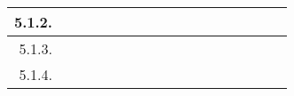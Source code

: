 \documentclass[12pt]{article}
\begin{document}
\begin{table}[H]
{\begin{tabular}{|rllllllllllllllll|}
			\multicolumn{1}{|r|}{5.1.2.}                                       & \multicolumn{1}{c|}{\cellcolor[HTML]{B6D7A8}}  & \multicolumn{1}{c|}{\cellcolor[HTML]{B6D7A8}}  & \multicolumn{1}{l|}{}                          & \multicolumn{1}{l|}{}                          & \multicolumn{1}{l|}{}                          & \multicolumn{1}{l|}{}                          & \multicolumn{1}{l|}{}                          & \multicolumn{1}{l|}{}                          & \multicolumn{1}{l|}{}                          & \multicolumn{1}{l|}{}                           & \multicolumn{1}{l|}{}                           & \multicolumn{1}{l|}{}                           & \multicolumn{1}{l|}{}                           & \multicolumn{1}{l|}{}                           & \multicolumn{1}{l|}{}                           &                                                 \\ \hline
			\multicolumn{1}{|r|}{5.1.3.}                                       & \multicolumn{1}{l|}{}                          & \multicolumn{1}{c|}{\cellcolor[HTML]{B6D7A8}}  & \multicolumn{1}{c|}{\cellcolor[HTML]{B6D7A8}}  & \multicolumn{1}{c|}{\cellcolor[HTML]{B6D7A8}}  & \multicolumn{1}{l|}{}                          & \multicolumn{1}{l|}{}                          & \multicolumn{1}{l|}{}                          & \multicolumn{1}{l|}{}                          & \multicolumn{1}{l|}{}                          & \multicolumn{1}{l|}{}                           & \multicolumn{1}{l|}{}                           & \multicolumn{1}{l|}{}                           & \multicolumn{1}{l|}{}                           & \multicolumn{1}{l|}{}                           & \multicolumn{1}{l|}{}                           &                                                 \\ \hline
			\multicolumn{1}{|r|}{5.1.4.}                                       & \multicolumn{1}{l|}{}                          & \multicolumn{1}{l|}{}                          & \multicolumn{1}{c|}{\cellcolor[HTML]{B6D7A8}}  & \multicolumn{1}{l|}{}                          & \multicolumn{1}{l|}{}                          & \multicolumn{1}{l|}{}                          & \multicolumn{1}{l|}{}                          & \multicolumn{1}{l|}{}                          & \multicolumn{1}{l|}{}                          & \multicolumn{1}{l|}{}                           & \multicolumn{1}{l|}{}                           & \multicolumn{1}{l|}{}                           & \multicolumn{1}{l|}{}                           & \multicolumn{1}{l|}{}                           & \multicolumn{1}{l|}{}                           &                                                 \\ \hline

\end{tabular}}
\end{table}
\end{document}

